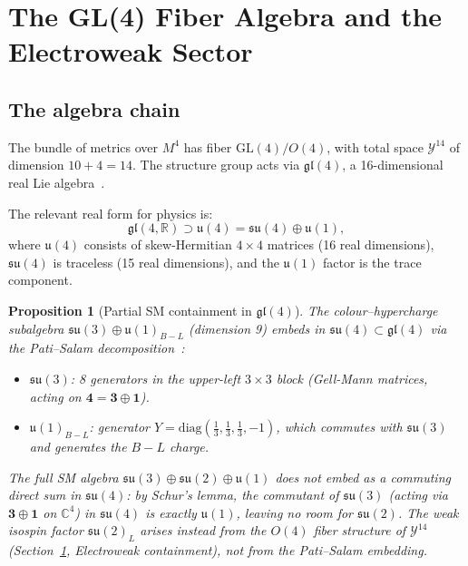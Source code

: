 \documentclass[12pt,a4paper]{article}
\theoremstyle{plain}
\newtheorem{proposition}[theorem]{Proposition}
\theoremstyle{definition}
\theoremstyle{remark}
\begin{document}
\section{The GL(4) Fiber Algebra and the Electroweak Sector}
\label{sec:gl4}

\subsection{The algebra chain}

The bundle of metrics over $M^4$ has fiber $\mathrm{GL}(4)/O(4)$, with total 
space $\mathcal{Y}^{14}$ of dimension $10 + 4 = 14$.  
The structure group acts via $\mathfrak{gl}(4)$, a 16-dimensional real Lie algebra~\cite{Dynkin1947}.

The relevant real form for physics is:
\begin{equation}
  \mathfrak{gl}(4,\mathbb{R}) \supset \mathfrak{u}(4) = \mathfrak{su}(4) \oplus \mathfrak{u}(1),
\end{equation}
where $\mathfrak{u}(4)$ consists of skew-Hermitian $4\times 4$ matrices (16 real 
dimensions), $\mathfrak{su}(4)$ is traceless (15 real dimensions), and the 
$\mathfrak{u}(1)$ factor is the trace component.

\begin{proposition}[Partial SM containment in $\mathfrak{gl}(4)$]\label{thm:SM-containment}
The colour--hypercharge subalgebra $\mathfrak{su}(3) \oplus \mathfrak{u}(1)_{B-L}$ 
(dimension 9) embeds in $\mathfrak{su}(4) \subset \mathfrak{gl}(4)$ via the 
Pati--Salam decomposition~\cite{PatiSalam1974}:
\begin{itemize}[noitemsep]
  \item $\mathfrak{su}(3)$: 8 generators in the upper-left $3\times 3$ block 
    (Gell-Mann matrices, acting on $\mathbf{4} = \mathbf{3} \oplus \mathbf{1}$).
  \item $\mathfrak{u}(1)_{B-L}$: generator $Y = \mathrm{diag}(\tfrac{1}{3},\tfrac{1}{3},\tfrac{1}{3},-1)$,
    which commutes with $\mathfrak{su}(3)$ and generates the $B-L$ charge.
\end{itemize}
The full SM algebra $\mathfrak{su}(3) \oplus \mathfrak{su}(2) \oplus \mathfrak{u}(1)$ does 
\emph{not} embed as a commuting direct sum in $\mathfrak{su}(4)$: by Schur's lemma, the 
commutant of $\mathfrak{su}(3)$ (acting via $\mathbf{3}\oplus\mathbf{1}$ on $\mathbb{C}^4$) 
in $\mathfrak{su}(4)$ is exactly $\mathfrak{u}(1)$, leaving no room for 
$\mathfrak{su}(2)$.  The weak isospin factor $\mathfrak{su}(2)_L$ arises instead from 
the $O(4)$ fiber structure of $\mathcal{Y}^{14}$ 
(Section~\ref{sec:gl4}, Electroweak containment), not from the Pati--Salam embedding.
\end{proposition}
\end{document}
